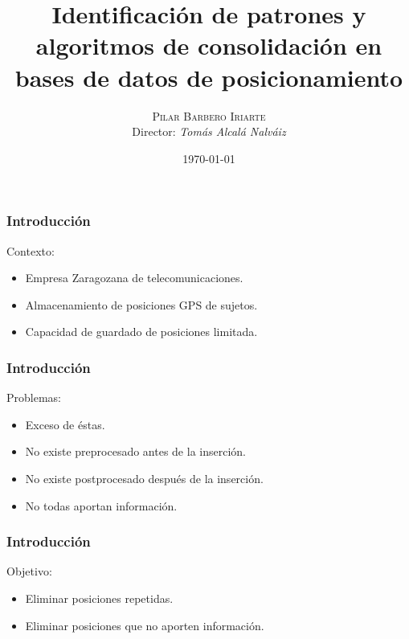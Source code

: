 \documentclass[10pt, spanish]{beamer}
\title{Identificaci\'on de patrones y algoritmos de consolidaci\'on en bases de datos de posicionamiento}
\date{\today}
\author{\textsc{Pilar Barbero Iriarte}\\
Director: \textit{Tom\'as Alcal\'a Nalv\'aiz}}
\institute{Universidad de Zaragoza}
\begin{document}
\maketitle



\begin{frame}[fragile]
\frametitle{Introducci\'on}
Contexto: 
\begin{itemize}
	\item Empresa Zaragozana de telecomunicaciones.
	\item Almacenamiento de posiciones GPS de sujetos.
	\item Capacidad de guardado de posiciones limitada.
\end{itemize}
\end{frame}


\begin{frame}[fragile]
\frametitle{Introducci\'on}
Problemas:
	\begin{itemize}
		\item Exceso de \'estas.
		\item No existe preprocesado antes de la inserci\'on.
		\item No existe postprocesado despu\'es de la inserci\'on.
		\item No todas aportan informaci\'on.
	\end{itemize}
\end{frame}

\begin{frame}[fragile]
  \frametitle{Introducci\'on}
  Objetivo:
  \begin{itemize}
  	  \item Eliminar posiciones repetidas.
  	  \item Eliminar posiciones que no aporten informaci\'on.
   \end{itemize}
\end{frame}

\end{document}
